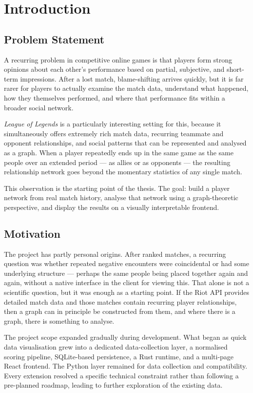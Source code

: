\chapter{Introduction}

\section{Problem Statement}

A recurring problem in competitive online games is that players form strong opinions about each other's performance based on partial, subjective, and short-term impressions. After a lost match, blame-shifting arrives quickly, but it is far rarer for players to actually examine the match data, understand what happened, how they themselves performed, and where that performance fits within a broader social network.

\emph{League of Legends} is a particularly interesting setting for this, because it simultaneously offers extremely rich match data, recurring teammate and opponent relationships, and social patterns that can be represented and analysed as a graph. When a player repeatedly ends up in the same game as the same people over an extended period --- as allies or as opponents --- the resulting relationship network goes beyond the momentary statistics of any single match.

This observation is the starting point of the thesis. The goal: build a player network from real match history, analyse that network using a graph-theoretic perspective, and display the results on a visually interpretable frontend.

\section{Motivation}

The project has partly personal origins. After ranked matches, a recurring question was whether repeated negative encounters were coincidental or had some underlying structure --- perhaps the same people being placed together again and again, without a native interface in the client for viewing this. That alone is not a scientific question, but it was enough as a starting point. If the Riot API provides detailed match data and those matches contain recurring player relationships, then a graph can in principle be constructed from them, and where there is a graph, there is something to analyse.

The project scope expanded gradually during development. What began as quick data visualisation grew into a dedicated data-collection layer, a normalised scoring pipeline, SQLite-based persistence, a Rust runtime, and a multi-page React frontend. The Python layer remained for data collection and compatibility. Every extension resolved a specific technical constraint rather than following a pre-planned roadmap, leading to further exploration of the existing data.

